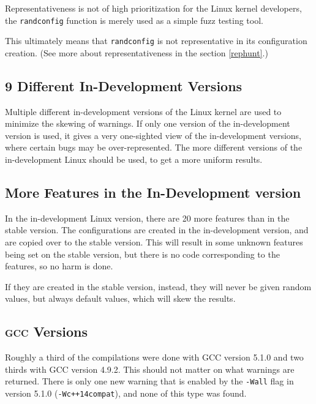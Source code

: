 \documentclass[a4paper,11pt]{report}
\begin{document}
Representativeness is not of high prioritization for the Linux kernel 
developers, the \texttt{randconfig} function is merely used as a simple fuzz 
testing tool.

This ultimately means that \texttt{randconfig} is not representative in its 
configuration creation. (See more about representativeness in the section 
\ref{rephunt}.)
\\



            \subsection{9 Different In-Development Versions}
Multiple different in-development versions of the Linux kernel are used to 
minimize the skewing of warnings. If only one version of the in-development 
version is used, it gives a very one-sighted view of the in-development 
versions, where certain bugs may be over-represented. The more different 
versions of the in-development Linux should be used, to get a more uniform 
results.


            \subsection{More Features in the In-Development version}
In the in-development Linux version, there are 20 more features than in the 
stable version. The configurations are created in the in-development version, 
and are copied over to the stable version. This will result in some unknown 
features being set on the stable version, but there is no code corresponding to 
the features, so no harm is done.

If they are created in the stable version, instead, they will never be given 
random values, but always default values, which will skew the results.
\\


            \subsection{\textsc{gcc} Versions}
Roughly a third of the compilations were done with GCC version 5.1.0 and two 
thirds with GCC version 4.9.2. This should not matter on what warnings are 
returned. There is only one new warning that is enabled by the \texttt{-Wall} 
flag in version 5.1.0 (\texttt{-Wc++14compat}), and none of this type was found.
\\
\end{document}
